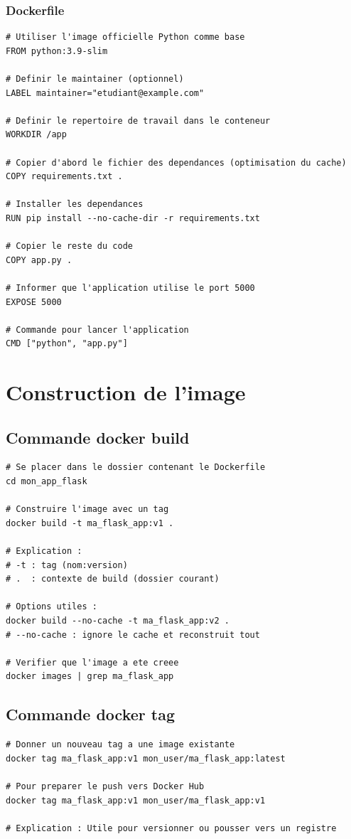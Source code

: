 \documentclass[a4paper,12pt]{article}
\begin{document}
\subsubsection{Dockerfile}
\begin{lstlisting}[caption=Dockerfile pour l'application Flask]
# Utiliser l'image officielle Python comme base
FROM python:3.9-slim

# Definir le maintainer (optionnel)
LABEL maintainer="etudiant@example.com"

# Definir le repertoire de travail dans le conteneur
WORKDIR /app

# Copier d'abord le fichier des dependances (optimisation du cache)
COPY requirements.txt .

# Installer les dependances
RUN pip install --no-cache-dir -r requirements.txt

# Copier le reste du code
COPY app.py .

# Informer que l'application utilise le port 5000
EXPOSE 5000

# Commande pour lancer l'application
CMD ["python", "app.py"]
\end{lstlisting}

\section{Construction de l'image}

\subsection{Commande docker build}
\begin{lstlisting}[caption=Construire une image]
# Se placer dans le dossier contenant le Dockerfile
cd mon_app_flask

# Construire l'image avec un tag
docker build -t ma_flask_app:v1 .

# Explication :
# -t : tag (nom:version)
# .  : contexte de build (dossier courant)

# Options utiles :
docker build --no-cache -t ma_flask_app:v2 .
# --no-cache : ignore le cache et reconstruit tout

# Verifier que l'image a ete creee
docker images | grep ma_flask_app
\end{lstlisting}

\subsection{Commande docker tag}
\begin{lstlisting}[caption=Tagger une image]
# Donner un nouveau tag a une image existante
docker tag ma_flask_app:v1 mon_user/ma_flask_app:latest

# Pour preparer le push vers Docker Hub
docker tag ma_flask_app:v1 mon_user/ma_flask_app:v1

# Explication : Utile pour versionner ou pousser vers un registre
\end{lstlisting}
\end{document}
